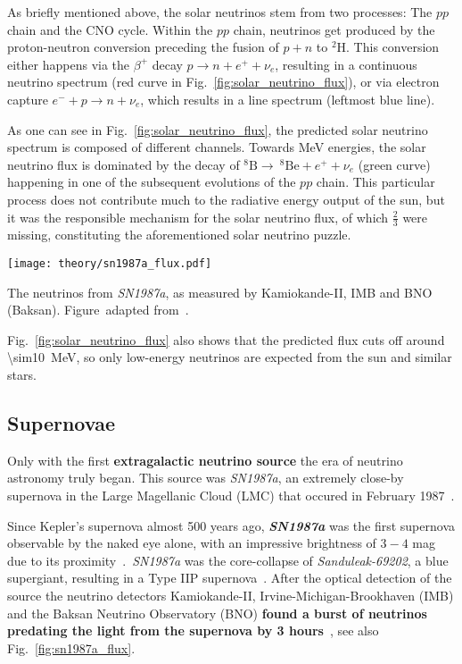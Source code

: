 As briefly mentioned above, the solar neutrinos stem from two processes: The $pp$ chain and the CNO cycle. Within the $pp$ chain, neutrinos get produced by the proton-neutron conversion preceding the fusion of $p+n$ to $^2 \text{H}$. This conversion either happens via the $\beta^+$ decay $p \rightarrow n + e^+ + \nu_e$, resulting in a continuous neutrino spectrum (red curve in Fig.~\ref{fig:solar_neutrino_flux}), or via electron capture $e^- + p \rightarrow n + \nu_e$, which results in a line spectrum (leftmost blue line).

As one can see in Fig.~\ref{fig:solar_neutrino_flux}, the predicted solar neutrino spectrum is composed of different channels. Towards \unit{\mega\eV} energies, the solar neutrino flux is dominated by the decay of $^8\text{B}\rightarrow ~^8\text{Be} + e^+ + \nu_e$ (green curve) happening in one of the subsequent evolutions of the $pp$ chain. This particular process does not contribute much to the radiative energy output of the sun, but it was the responsible mechanism for the solar neutrino flux, of which $\frac{2}{3}$ were missing, constituting the aforementioned solar neutrino puzzle.

\begin{marginfigure}
    \texttt{[image: theory/sn1987a\_flux.pdf]}
    \caption[Neutrinos from \emph{SN1987a}]{The neutrinos from \emph{SN1987a}, as measured by Kamiokande-II, IMB and BNO (Baksan). Figure\ adapted from~\cite{Grupen2005}.}
\end{marginfigure}

Fig.~\ref{fig:solar_neutrino_flux} also shows that the predicted flux cuts off around \SI{\sim10}{\mega\eV}, so only low-energy neutrinos are expected from the sun and similar stars.

\subsection{Supernovae}\label{sne}
Only with the first \textbf{extragalactic neutrino source} the era of neutrino astronomy truly began. This source was \emph{SN1987a}, an extremely close-by supernova in the Large Magellanic Cloud (LMC) that occured in February 1987~.

Since Kepler's supernova almost 500 years ago, \textbf{\emph{SN1987a}} was the first supernova observable by the naked eye alone, with an impressive brightness of $3-4$ mag due to its proximity~.\ \emph{SN1987a} was the core-collapse of \emph{Sanduleak-69202}, a blue supergiant, resulting in a Type IIP supernova~. After the optical detection of the source the neutrino detectors Kamiokande-II, Irvine-Michigan-Brookhaven (IMB) and the Baksan Neutrino Observatory (BNO) \textbf{found a burst of neutrinos predating the light from the supernova by 3 hours}~, see also Fig.~\ref{fig:sn1987a_flux}.

